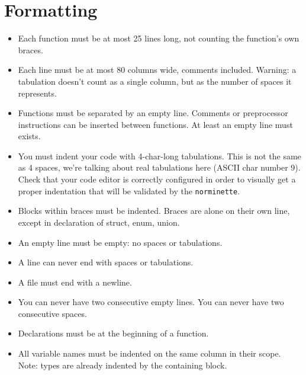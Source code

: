 \documentclass{42-en}
\begin{document}
    \section{Formatting}

            \begin{itemize}

            \item Each function must be at most 25 lines long, not
              counting the function's own braces.

            \item Each line must be at most 80 columns wide, comments
              included. Warning: a tabulation doesn't count
              as a single column, but as the number of spaces it
              represents.

            \item Functions must be separated by an empty line. Comments or preprocessor instructions
              can be inserted between functions. At least an empty line must exists.

            \item You must indent your code with 4-char-long tabulations.
              This is not the same as 4 spaces, we're talking about real tabulations here (ASCII char number 9).
              Check that your code editor is correctly configured in order to visually get a proper indentation
              that will be validated by the \texttt{norminette}.

            \item Blocks within braces must be indented. Braces are alone on their own line,
              except in declaration of struct, enum, union.

            \item An empty line must be empty: no spaces or tabulations.

            \item A line can never end with spaces or tabulations.

            \item A file must end with a newline.
              
            \item You can never have two consecutive empty lines.
              You can never have two consecutive spaces.

            \item Declarations must be at the beginning of a function.

            \item All variable names must be indented on the same
              column in their scope. Note: types are already indented by the containing block.


\end{itemize}
\end{document}
